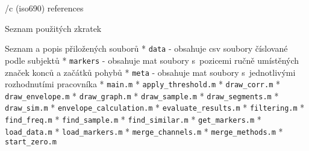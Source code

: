 \bibchap
    \usebib/c (iso690) references

\app Seznam použitých zkratek
    \makeglos

\app Seznam a popis přiložených souborů
    \begitems
    * {\tt data} - obsahuje csv soubory číslované podle subjektů
    \begitems
    * {\tt markers} - obsahuje mat soubory s~pozicemi ručně umístěných značek konců a začátků pohybů
    \enditems
    * {\tt meta} - obsahuje mat soubory s~jednotlivými rozhodnutími pracovníka
    * {\tt main.m}
    * {\tt apply_threshold.m}
    * {\tt draw_corr.m}
    * {\tt draw_envelope.m}
    * {\tt draw_graph.m}
    * {\tt draw_sample.m}
    * {\tt draw_segments.m}
    * {\tt draw_sim.m}
    * {\tt envelope_calculation.m}
    * {\tt evaluate_results.m}
    * {\tt filtering.m}
    * {\tt find_freq.m}
    * {\tt find_sample.m}
    * {\tt find_similar.m}
    * {\tt get_markers.m}
    * {\tt load_data.m}
    * {\tt load_markers.m}
    * {\tt merge_channels.m}
    * {\tt merge_methods.m}
    * {\tt start_zero.m}
    \enditems
